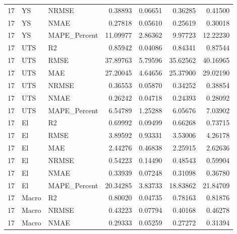 \begin{tabular}{rllrrrr}
17 & YS & NRMSE & 0.38893 & 0.06651 & 0.36285 & 0.41500 \\
17 & YS & NMAE & 0.27818 & 0.05610 & 0.25619 & 0.30018 \\
17 & YS & MAPE_Percent & 11.09977 & 2.86362 & 9.97723 & 12.22230 \\
17 & UTS & R2 & 0.85942 & 0.04086 & 0.84341 & 0.87544 \\
17 & UTS & RMSE & 37.89763 & 5.79596 & 35.62562 & 40.16965 \\
17 & UTS & MAE & 27.20045 & 4.64656 & 25.37900 & 29.02190 \\
17 & UTS & NRMSE & 0.36553 & 0.05870 & 0.34252 & 0.38854 \\
17 & UTS & NMAE & 0.26242 & 0.04718 & 0.24393 & 0.28092 \\
17 & UTS & MAPE_Percent & 6.54789 & 1.25288 & 6.05676 & 7.03902 \\
17 & El & R2 & 0.69992 & 0.09499 & 0.66268 & 0.73715 \\
17 & El & RMSE & 3.89592 & 0.93331 & 3.53006 & 4.26178 \\
17 & El & MAE & 2.44276 & 0.46838 & 2.25915 & 2.62636 \\
17 & El & NRMSE & 0.54223 & 0.14490 & 0.48543 & 0.59904 \\
17 & El & NMAE & 0.33939 & 0.07248 & 0.31098 & 0.36780 \\
17 & El & MAPE_Percent & 20.34285 & 3.83733 & 18.83862 & 21.84709 \\
17 & Macro & R2 & 0.80020 & 0.04735 & 0.78163 & 0.81876 \\
17 & Macro & NRMSE & 0.43223 & 0.07794 & 0.40168 & 0.46278 \\
17 & Macro & NMAE & 0.29333 & 0.05259 & 0.27272 & 0.31394 \\
\bottomrule
\end{tabular}
